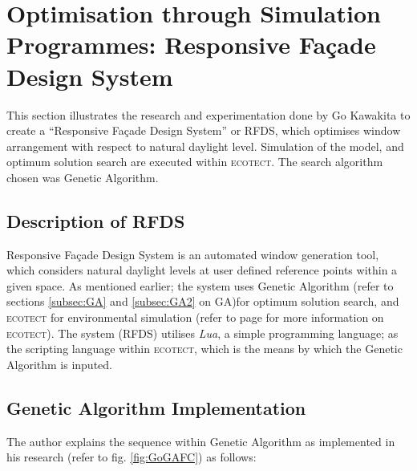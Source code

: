 \clearpage

\section{Optimisation through Simulation Programmes: Responsive Fa\c{c}ade Design System}
\label{sec:RFDS}

This section illustrates the research and experimentation done by Go Kawakita \cite{kawakita08} to create a ``Responsive Fa\c{c}ade Design System'' or RFDS, which optimises window arrangement with respect to natural daylight level. Simulation of the model, and optimum solution search are executed within \textsc{ecotect}. The search algorithm chosen was Genetic Algorithm.

\subsection{Description of RFDS}

Responsive Fa\c{c}ade Design System is an automated window generation tool, which considers natural daylight levels at user defined reference points within a given space. As mentioned earlier; the system uses Genetic Algorithm (refer to sections \ref{subsec:GA} and \ref{subsec:GA2} on GA)for optimum solution search, and \textsc{ecotect} for environmental simulation (refer to page \pageref{par:ECOTECT} for more information on \textsc{ecotect}). The system (RFDS) utilises \emph{Lua}, a simple programming language; as the scripting language within \textsc{ecotect}, which is the means by which the Genetic Algorithm is inputed.

\subsection{Genetic Algorithm Implementation}

The author explains the sequence within Genetic Algorithm as implemented in his research (refer to fig. \ref{fig:GoGAFC}) as follows:

